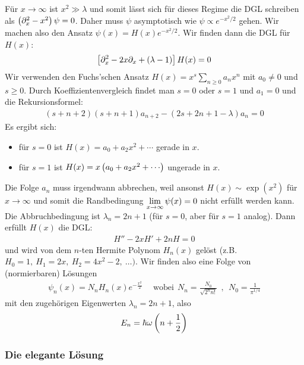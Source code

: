 Für $x \rightarrow \infty$ ist $x^2 \gg \lambda$ und somit lässt sich für dieses
Regime die DGL schreiben als $\left( \partial_x^2 - x^2 \right) \psi = 0$. Daher muss
$\psi$ asymptotisch wie $\psi \propto e^{-x^2/2}$ gehen. Wir machen also den
Ansatz $\psi(x) = H(x) e^{-x^2/2}$. Wir finden dann die DGL für $H(x)$:
\begin{align*}
    \left[ \partial_x^2 - 2 x \partial_x + (\lambda-1) \right] H(x) = 0
\end{align*}
Wir verwenden den Fuchs'schen Ansatz $H(x) = x^s \sum_{n \geq 0} a_n x^n$ mit
$a_0 \neq 0$ und $s \geq 0$. Durch Koeffizientenvergleich findet man $s=0$ oder $s=1$
und $a_1 = 0$ und die Rekursionsformel:
\begin{align*}
    (s + n + 2)(s + n + 1) a_{n+2} - (2s + 2n + 1 - \lambda) a_n = 0
\end{align*}
Es ergibt sich:
\begin{itemize}
    \item für $s=0$ ist $H(x) = a_0 + a_2 x^2 + \dotsb$ gerade in $x$.
    \item für $s=1$ ist $H(x) = x \klammer{a_0 + a_2 x^2 + \dotsb}$ ungerade in $x$.
\end{itemize}
Die Folge $a_n$ muss irgendwann abbrechen, weil ansonst $H(x) \sim \exp(x^2)$ für
$x \rightarrow \infty$ und somit die Randbedingung $\lim\limits_{x \rightarrow \infty}
\psi(x) = 0$ nicht erfüllt werden kann. Die Abbruchbedingung ist $\lambda_n = 2n+1$
(für $s=0$, aber für $s=1$ analog). Dann erfüllt $H(x)$ die DGL:
\begin{align*}
    H'' - 2 x H' + 2 n H = 0
\end{align*}
und wird von dem $n$-ten Hermite Polynom $H_n (x)$ gelöst (z.B. $H_0 = 1, \ H_1 = 2x, \
H_2 = 4 x^2 - 2, \ \dots)$. Wir finden also eine Folge von (normierbaren) Lösungen
\begin{align*}
    \psi_n (x) = N_n H_n (x) e^{- \frac{x^2}{2}}
    \hspace{15pt} \text{wobei} \ \ N_n = \frac{N_0}{\sqrt{2^n n!}} \ \ , \ \
    N_0 = \frac{1}{\pi^{1/4}}
\end{align*}
mit den zugehörigen Eigenwerten $\lambda_n = 2n+1$, also
\begin{align*}
    E_n = \hbar \omega \left( n + \frac{1}{2} \right)
\end{align*}

\subsubsection{Die elegante Lösung}

